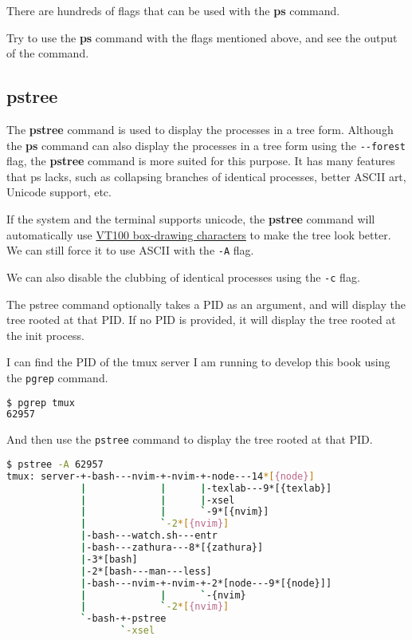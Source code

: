 There are hundreds of flags that can be used with the \textbf{ps} command.

\begin{exercise}
  Try to use the \textbf{ps} command with the flags mentioned above, and see
  the output of the command.
\end{exercise}

\subsection{pstree}

The \textbf{pstree} command is used to display the processes in a tree form.
Although the \textbf{ps} command can also display the processes in a tree form
using the \lstinline|--forest| flag, the \textbf{pstree} command is more suited
for this purpose. It has many features that ps lacks, such as collapsing
branches of identical processes, better ASCII art, Unicode support, etc.

If the system and the terminal supports unicode, the \textbf{pstree} command
will automatically use
\href{https://en.wikipedia.org/wiki/Box-drawing\_character}{VT100 box-drawing characters}
to make the tree look better. We can still force it to use ASCII with the
\lstinline|-A| flag.

We can also disable the clubbing of identical processes using the \lstinline|-c| flag.

The pstree command optionally takes a PID as an argument, and will display
the tree rooted at that PID. If no PID is provided, it will display the
tree rooted at the init process.

I can find the PID of the tmux server I am running to develop this book
using the \lstinline|pgrep| command.
\begin{lstlisting}[language=bash]
$ pgrep tmux
62957
\end{lstlisting}

And then use the \lstinline|pstree| command
to display the tree rooted at that PID.

\begin{lstlisting}[language=bash]
$ pstree -A 62957
tmux: server-+-bash---nvim-+-nvim-+-node---14*[{node}]
             |             |      |-texlab---9*[{texlab}]
             |             |      |-xsel
             |             |      `-9*[{nvim}]
             |             `-2*[{nvim}]
             |-bash---watch.sh---entr
             |-bash---zathura---8*[{zathura}]
             |-3*[bash]
             |-2*[bash---man---less]
             |-bash---nvim-+-nvim-+-2*[node---9*[{node}]]
             |             |      `-{nvim}
             |             `-2*[{nvim}]
             `-bash-+-pstree
                    `-xsel
\end{lstlisting}

